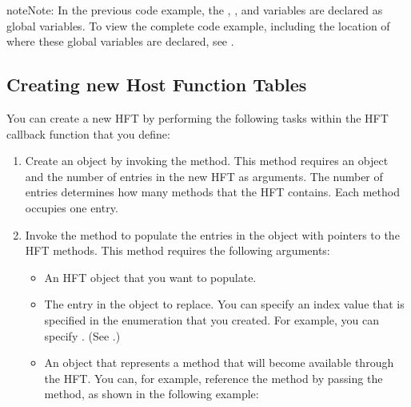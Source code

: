 \documentclass[letterpaper,12pt,english,openany,oneside]{sphinxmanual}
\begin{document}
\begin{sphinxadmonition}{note}{Note:}
In the previous code example, the , , and  variables are declared as global variables. To view the complete code example, including the location of where these global variables are declared, see .
\end{sphinxadmonition}


\subsection{Creating new Host Function Tables}
\label{\detokenize{Plugins_Hft:creating-new-host-function-tables}}
You can create a new HFT by performing the following tasks within the HFT callback function that you define:
\begin{enumerate}
%
\item {} 
Create an  object by invoking the  method. This method requires an  object and the number of entries in the new HFT as arguments. The number of entries determines how many methods that the HFT contains. Each method occupies one entry.

\item {} 
Invoke the  method to populate the entries in the  object with pointers to the HFT methods. This method requires the following arguments:
\begin{itemize}
\item {} 
An HFT object that you want to populate.

\item {} 
The entry in the  object to replace. You can specify an index value that is specified in the enumeration that you created. For example, you can specify . (See .)

\item {} 
An  object that represents a method that will become available through the HFT. You can, for example, reference the  method by passing the  method, as shown in the following example:

\end{itemize}

\end{enumerate}
\end{document}
